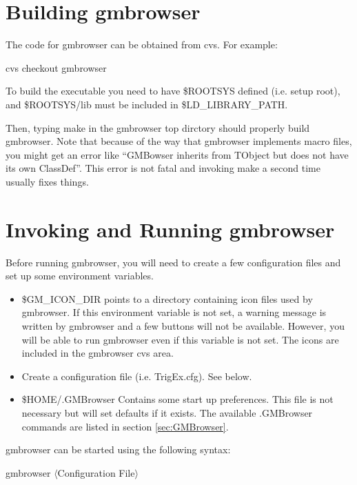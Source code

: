\documentclass[12pt]{article}
\def\begi{\begin{itemize}}
\def\endi{\end{itemize}}
\begin{document}
\section[Building gmbrowser]{Building gmbrowser}
The code for gmbrowser can be obtained from cvs. For example:

  \qquad cvs checkout gmbrowser

To build the executable you need to have \$ROOTSYS defined
(i.e. setup root), and \$ROOTSYS/lib must be included in
\$LD\_LIBRARY\_PATH.

Then, typing make in the gmbrowser top dirctory should properly build
gmbrowser. Note that because of the way that gmbrowser implements
macro files, you might get an error like ``GMBowser inherits from
TObject but does not have its own ClassDef''. This error is not
fatal and invoking make a second time usually fixes things.

\section[Invoking and Running gmbrowser]{Invoking and Running gmbrowser}

  Before running gmbrowser, you will need to create a few configuration
  files and set up some environment variables.
  \begi

  \item \$GM\_ICON\_DIR
    points to a directory containing icon files used by gmbrowser.
    If this environment variable is not set, a warning message is
    written by gmbrowser and a few buttons will not be available.
    However, you will be able to run gmbrowser even if this variable
    is not set. The icons are included in the gmbrowser cvs area.

  \item Create a configuration file (i.e. TrigEx.cfg).
    See below.

  \item \$HOME/.GMBrowser
    Contains some start up preferences. This file is not necessary
    but will set defaults if it exists. The available .GMBrowser
    commands are listed in section \ref{sec:GMBrowser}.
\endi

gmbrowser can be started using the following syntax:

\qquad gmbrowser $\langle$Configuration File$\rangle$
\end{document}
